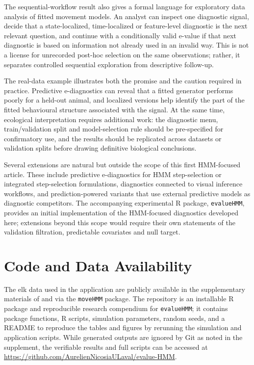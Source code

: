 \documentclass[pdflatex,sn-basic]{sn-jnl}
\theoremstyle{thmstyleone}
\theoremstyle{thmstyletwo}
\theoremstyle{thmstylethree}
\newcommand{\1}{\mathbf 1}
\begin{document}
The sequential-workflow result also gives a formal language for exploratory data analysis of fitted movement models. An analyst can inspect one diagnostic signal, decide that a state-localized, time-localized or feature-level diagnostic is the next relevant question, and continue with a conditionally valid e-value if that next diagnostic is based on information not already used in an invalid way. This is not a license for unrecorded post-hoc selection on the same observations; rather, it separates controlled sequential exploration from descriptive follow-up.

The real-data example illustrates both the promise and the caution required in practice. Predictive e-diagnostics can reveal that a fitted generator performs poorly for a held-out animal, and localized versions help identify the part of the fitted behavioural structure associated with the signal. At the same time, ecological interpretation requires additional work: the diagnostic menu, train/validation split and model-selection rule should be pre-specified for confirmatory use, and the results should be replicated across datasets or validation splits before drawing definitive biological conclusions.

Several extensions are natural but outside the scope of this first HMM-focused article. These include predictive e-diagnostics for HMM step-selection or integrated step-selection formulations, diagnostics connected to visual inference workflows, and prediction-powered variants that use external predictive models as diagnostic competitors. The accompanying experimental R package, \texttt{evalueHMM}, provides an initial implementation of the HMM-focused diagnostics developed here; extensions beyond this scope would require their own statements of the validation filtration, predictable covariates and null target.


\section*{Code and Data Availability}
The elk data used in the application are publicly available in the supplementary materials of \cite{michelot_2016_movehmm} and via the \texttt{moveHMM} package. The repository is an installable R package and reproducible research compendium for \texttt{evalueHMM}; it contains package functions, R scripts, simulation parameters, random seeds, and a README to reproduce the tables and figures by rerunning the simulation and application scripts. While generated outputs are ignored by Git as noted in the supplement, the verifiable results and full scripts can be accessed at \url{https://github.com/AurelienNicosiaULaval/evalue-HMM}.
\end{document}
